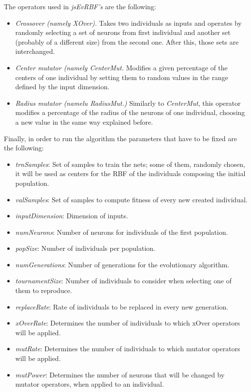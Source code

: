 \documentclass{article}
\begin{document}
The operators used in {\em jsEvRBF's} are the following:

\begin{itemize}
\item {\em Crossover (namely XOver).} Takes two individuals as inputs and operates by randomly selecting a set of neurons from first individual and another set (probably of a different size) from the second one. After this, those sets are interchanged.
\item {\em Center mutator (namely CenterMut.} Modifies a given percentage of the centers of one individual by setting them to random values in the range defined by the input dimension.
\item {\em Radius mutator (namelu RadiusMut.)} Similarly to \emph{CenterMut}, this operator modifies a percentage of the radius of the neurons of one individual, choosing a new value in the same way explained before.
\end{itemize}


Finally, in order to run the algorithm the parameters that have to be fixed are the following:
\begin{itemize}
\item{\em trnSamples}: Set of samples to train the nets; some of them, randomly chosen, it will be used as centers for the RBF of the individuals composing the initial population.
\item{\em valSamples}: Set of samples to compute fitness of every new created individual.
\item{\em inputDimension}: Dimension of inputs.
\item{\em numNeurons}: Number of neurons for individuals of the first population.
\item{\em popSize}: Number of individuals per population.
\item{\em numGenerations}: Number of generations for the evolutionary algorithm.
\item{\em tournamentSize}: Number of individuals to consider when selecting one of them to reproduce.
\item{\em replaceRate}: Rate of individuals to be replaced in every new generation.
\item{\em xOverRate}: Determines the number of individuals to which xOver operators will be applied.
\item{\em mutRate}: Determines the number of individuals to which mutator operators will be applied.
\item{\em mutPower}: Determines the number of neurons that will be changed by mutator operators, when applied to an individual.
\end{itemize}
\end{document}
